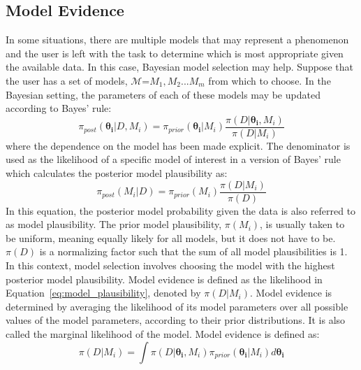 \subsection{Model Evidence} 
In some situations, there are multiple models that may represent a phenomenon 
and the user is left with the task to determine which is most appropriate given 
the available data. In this case, Bayesian model selection may help.  Suppose that 
the user has a set of models, $\mathcal{M}$={$M_1,M_2...M_m$} from which to 
choose.  In the Bayesian setting, the parameters of each of these models may be 
updated according to Bayes' rule: 
\begin{equation}
\pi_{post}(\boldsymbol{\theta_i}|D,M_i)=\pi_{prior}(\boldsymbol{\theta_i}|M_i)\frac{\pi(D|\boldsymbol{\theta_i},M_i)}{\pi(D|M_i)}
\end{equation}
where the dependence on the model has been made explicit.  The denominator is used
as the likelihood of a specific model of interest in a version of Bayes' rule which calculates 
the posterior model plausibility as: 
\begin{equation}
\pi_{post}(M_i|D)=\pi_{prior}(M_i)\frac{\pi(D|M_i)}{\pi(D)}
\label{eq:model_plausibility}
\end{equation}
In this equation, the posterior model probability given the data is 
also referred to as model plausibility.  The prior model plausibility, 
$\pi(M_i)$, is usually taken to be uniform, meaning equally likely for all 
models, but it does not have to be.  $\pi(D)$ is a normalizing factor such 
that the sum of all model plausibilities is 1.  In this context, model selection 
involves choosing the model with the highest posterior model plausibility. 
Model evidence is defined as the likelihood in 
Equation~\ref{eq:model_plausibility}, denoted by $\pi(D|M_i)$.  Model evidence 
is determined by averaging the likelihood of its model parameters over all possible 
values of the model parameters, according to their prior distributions.  It is 
also called the marginal likelihood of the model.  Model evidence 
is defined as: 
\begin{equation}
\pi(D|M_i)=\int \pi(D|\boldsymbol{\theta_i},M_i)\pi_{prior}(\boldsymbol{\theta_i}|M_i)d \boldsymbol{\theta_i}
\label{eq:uq:model_evidence}
\end{equation}


